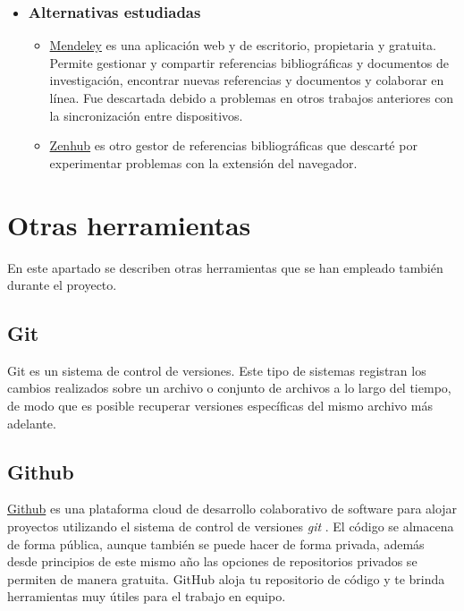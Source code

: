   
   \begin{itemize}
   	\item \subsubsection{Alternativas estudiadas}
   		\begin{itemize}
	 	\item \href{https://www.mendeley.com/}{Mendeley}  es una aplicación web y de escritorio, propietaria y gratuita. Permite gestionar y compartir referencias bibliográficas y documentos de investigación, encontrar nuevas referencias y documentos y colaborar en línea. Fue descartada debido a problemas en otros trabajos anteriores con la sincronización entre dispositivos.
	   	\item \href{https://www.zenhub.com/}{Zenhub} es otro gestor de referencias bibliográficas que descarté por experimentar problemas con la extensión del navegador.
		\end{itemize}
	\end{itemize}
  
  \section{Otras herramientas}\label{otrasherramientas}
En este apartado se describen otras herramientas que se han empleado también durante el proyecto.

 \subsection{Git}
Git \cite{git_2019} es un sistema de control de versiones. Este tipo de sistemas registran los cambios realizados sobre un archivo o conjunto de archivos a lo largo del tiempo, de modo que es posible recuperar versiones específicas del mismo archivo más adelante.

 \subsection{Github}
\href{https://github.com/}{Github} es una plataforma cloud de desarrollo colaborativo de software para alojar proyectos utilizando el sistema de control de versiones \textit{git} \cite{git_2019}. El código se almacena de forma pública, aunque también se puede hacer de forma privada, además desde principios de este mismo año las opciones de repositorios privados se permiten de manera gratuita.  GitHub aloja tu repositorio de código y te brinda herramientas muy útiles para el trabajo en equipo. 

